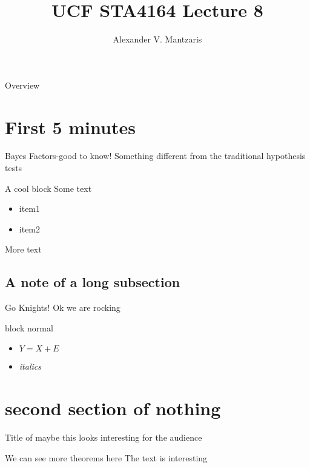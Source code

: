 \documentclass{beamer}
\title[Lect 8]{UCF STA4164 Lecture 8}
\author{Alexander V. Mantzaris}
\date{\vspace{-8cm}}
\begin{document}
\begin{frame}
  \titlepage
\end{frame}

\begin{frame}{Overview}
\tableofcontents
\end{frame}

\section{First 5 minutes}

\begin{frame}{Bayes Factors-good to know!} 
  Something different from the traditional hypothesis tests
  \begin{block}{A cool block}
    Some text
    \begin{itemize}
    \item item1
    \item item2
    \end{itemize}
  \end{block}
  More text
\end{frame}


\subsection{A note of a long subsection}
\begin{frame}{Go Knights!} 
  Ok we are rocking
  \begin{block}{block normal}
    \begin{itemize}
    \item $Y = X + E$
    \item \emph{italics}
    \end{itemize}
  \end{block}
  
\end{frame}

\section{second section of nothing}
\begin{frame}{Title of maybe this looks interesting for the audience}

  \begin{block}{We can see more theorems here}
    The text is interesting
  \end{block}
  
\end{frame}
\end{document}
